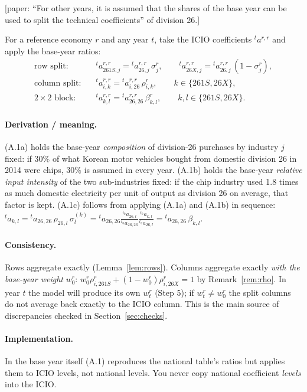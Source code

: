\documentclass[11pt,a4paper]{article}
\theoremstyle{remark}
\theoremstyle{definition}
\newcommand{\sem}{{261S}}   %
\newcommand{\oth}{{26X}}    %
\newcommand{\agg}{{26}}     %
\newcommand{\paper}[1]{\textcolor{blue!50!black}{[paper: #1]}}
\begin{document}
\paper{``For other years, it is assumed that the shares of the base year can be used to split the technical
coefficients'' of division 26.}

For a reference economy $r$ and any year $t$, take the ICIO coefficients ${}^{t}a^{r,r}$ and apply the base-year
ratios:
\begin{align}
 \text{row split:}\quad & {}^{t}a^{r,r}_{\sem,j} = {}^{t}a^{r,r}_{\agg,j}\,\sigma^r_j, \qquad
                          {}^{t}a^{r,r}_{\oth,j} = {}^{t}a^{r,r}_{\agg,j}\,(1-\sigma^r_j), \tag{A.1a}\\
 \text{column split:}\quad & {}^{t}a^{r,r}_{i,k} = {}^{t}a^{r,r}_{i,\agg}\,\rho^r_{i,k},\qquad k\in\{\sem,\oth\}, \tag{A.1b}\\
 2\times 2\text{ block:}\quad & {}^{t}a^{r,r}_{k,l} = {}^{t}a^{r,r}_{\agg,\agg}\,\beta^r_{k,l},\qquad k,l\in\{\sem,\oth\}. \tag{A.1c}
\end{align}

\paragraph{Derivation / meaning.}
(A.1a) holds the base-year \emph{composition} of division-26 purchases by industry $j$ fixed: if 30\% of what
Korean motor vehicles bought from domestic division 26 in 2014 were chips, 30\% is assumed in every year.
(A.1b) holds the base-year \emph{relative input intensity} of the two sub-industries fixed: if the chip industry
used 1.8 times as much domestic electricity per unit of output as division 26 on average, that factor is kept.
(A.1c) follows from applying (A.1a) and (A.1b) in sequence:
${}^{t}a_{k,l} = {}^{t}a_{\agg,\agg}\,\rho_{\agg,l}\,\sigma^{(k)}_l
 = {}^{t}a_{\agg,\agg}\frac{{}^{t_0}a_{\agg,l}}{{}^{t_0}a_{\agg,\agg}}\frac{{}^{t_0}a_{k,l}}{{}^{t_0}a_{\agg,l}}
 = {}^{t}a_{\agg,\agg}\,\beta_{k,l}.$

\paragraph{Consistency.}
Rows aggregate exactly (Lemma~\ref{lem:rows}). Columns aggregate exactly \emph{with the base-year weight} $w^r_0$:
$w^r_0\rho^r_{i,\sem} + (1-w^r_0)\rho^r_{i,\oth} = 1$ by Remark~\ref{rem:rho}. In year $t$ the model will produce its
own $w^r_t$ (Step 5); if $w^r_t\neq w^r_0$ the split columns do not average back exactly to the ICIO column.
This is the main source of discrepancies checked in Section~\ref{sec:checks}.

\paragraph{Implementation.} In the base year itself (A.1) reproduces the national table's ratios but applies them
to ICIO levels, not national levels. You never copy national coefficient \emph{levels} into the ICIO.
\end{document}
